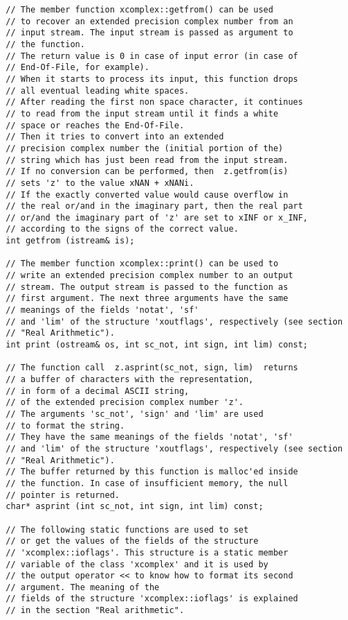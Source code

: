 \documentclass{article}
\begin{document}
\begin{verbatim}
  // The member function xcomplex::getfrom() can be used
  // to recover an extended precision complex number from an 
  // input stream. The input stream is passed as argument to
  // the function.
  // The return value is 0 in case of input error (in case of 
  // End-Of-File, for example). 
  // When it starts to process its input, this function drops
  // all eventual leading white spaces.
  // After reading the first non space character, it continues
  // to read from the input stream until it finds a white 
  // space or reaches the End-Of-File. 
  // Then it tries to convert into an extended
  // precision complex number the (initial portion of the) 
  // string which has just been read from the input stream.
  // If no conversion can be performed, then  z.getfrom(is)
  // sets 'z' to the value xNAN + xNANi.
  // If the exactly converted value would cause overflow in
  // the real or/and in the imaginary part, then the real part
  // or/and the imaginary part of 'z' are set to xINF or x_INF, 
  // according to the signs of the correct value.
  int getfrom (istream& is);

  // The member function xcomplex::print() can be used to
  // write an extended precision complex number to an output
  // stream. The output stream is passed to the function as 
  // first argument. The next three arguments have the same 
  // meanings of the fields 'notat', 'sf'
  // and 'lim' of the structure 'xoutflags', respectively (see section 
  // "Real Arithmetic").
  int print (ostream& os, int sc_not, int sign, int lim) const;

  // The function call  z.asprint(sc_not, sign, lim)  returns
  // a buffer of characters with the representation, 
  // in form of a decimal ASCII string,
  // of the extended precision complex number 'z'. 
  // The arguments 'sc_not', 'sign' and 'lim' are used 
  // to format the string.
  // They have the same meanings of the fields 'notat', 'sf'
  // and 'lim' of the structure 'xoutflags', respectively (see section 
  // "Real Arithmetic").
  // The buffer returned by this function is malloc'ed inside
  // the function. In case of insufficient memory, the null 
  // pointer is returned.
  char* asprint (int sc_not, int sign, int lim) const;

  // The following static functions are used to set
  // or get the values of the fields of the structure
  // 'xcomplex::ioflags'. This structure is a static member
  // variable of the class 'xcomplex' and it is used by 
  // the output operator << to know how to format its second
  // argument. The meaning of the
  // fields of the structure 'xcomplex::ioflags' is explained
  // in the section "Real arithmetic".


\end{verbatim}
\end{document}
